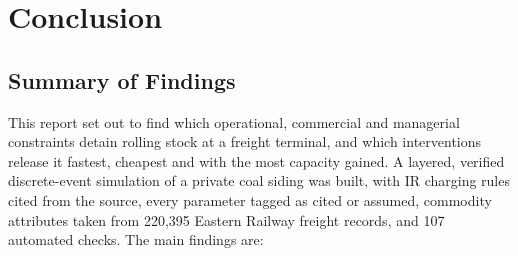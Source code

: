 \chapter{Conclusion}
\label{ch:conclusion}

\section{Summary of Findings}
This report set out to find which operational, commercial and managerial constraints detain rolling stock at a freight terminal, and which interventions release it fastest, cheapest and with the most capacity gained. A layered, verified discrete-event simulation of a private coal siding was built, with IR charging rules cited from the source, every parameter tagged as cited or assumed, commodity attributes taken from 220,395 Eastern Railway freight records, and 107 automated checks. The main findings are:
